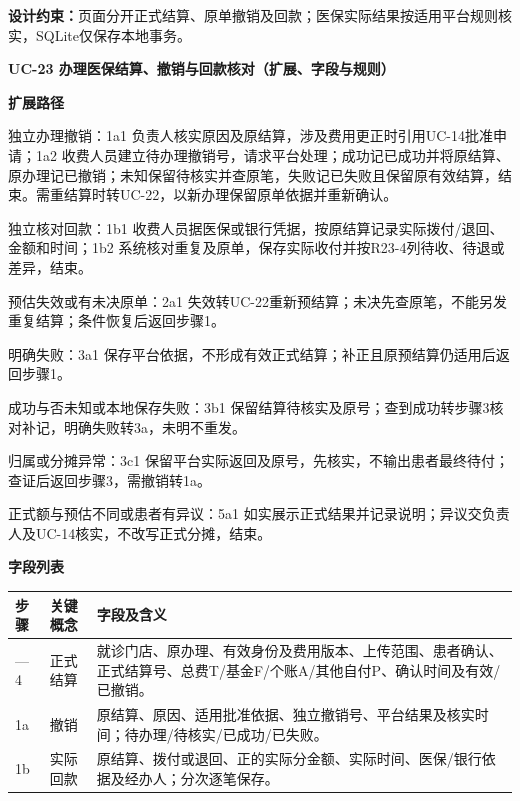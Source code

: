 \documentclass[UTF8,a4paper,zihao=-4,fontset=none]{ctexart}
\begin{document}
\noindent\textbf{设计约束：}页面分开正式结算、原单撤销及回款；医保实际结果按适用平台规则核实，SQLite仅保存本地事务。\par
\endgroup
\clearpage
\begingroup\small\linespread{1.04}\selectfont
\noindent\textbf{UC-23 办理医保结算、撤销与回款核对（扩展、字段与规则）}\par
\noindent\textbf{扩展路径}\par
\begin{description}\setlength{\itemsep}{0pt}\setlength{\parsep}{0pt}\setlength{\topsep}{2pt}
\item[1a] 独立办理撤销：1a1 负责人核实原因及原结算，涉及费用更正时引用UC-14批准申请；1a2 收费人员建立待办理撤销号，请求平台处理；成功记已成功并将原结算、原办理记已撤销；未知保留待核实并查原笔，失败记已失败且保留原有效结算，结束。需重结算时转UC-22，以新办理保留原单依据并重新确认。
\item[1b] 独立核对回款：1b1 收费人员据医保或银行凭据，按原结算记录实际拨付/退回、金额和时间；1b2 系统核对重复及原单，保存实际收付并按R23-4列待收、待退或差异，结束。
\item[2a] 预估失效或有未决原单：2a1 失效转UC-22重新预结算；未决先查原笔，不能另发重复结算；条件恢复后返回步骤1。
\item[3a] 明确失败：3a1 保存平台依据，不形成有效正式结算；补正且原预结算仍适用后返回步骤1。
\item[3b] 成功与否未知或本地保存失败：3b1 保留结算待核实及原号；查到成功转步骤3核对补记，明确失败转3a，未明不重发。
\item[3c] 归属或分摊异常：3c1 保留平台实际返回及原号，先核实，不输出患者最终待付；查证后返回步骤3，需撤销转1a。
\item[5a] 正式额与预估不同或患者有异议：5a1 如实展示正式结果并记录说明；异议交负责人及UC-14核实，不改写正式分摊，结束。
\end{description}
\noindent\textbf{字段列表}\par
{\setlength{\tabcolsep}{3pt}\renewcommand{\arraystretch}{1.04}
\noindent\begin{tabular}{@{}>{\raggedright\arraybackslash}p{1.2cm}>{\raggedright\arraybackslash}p{2.2cm}>{\raggedright\arraybackslash}p{12.3cm}@{}}
\toprule
步骤 & 关键概念 & 字段及含义 \\ \midrule
1—4 & 正式结算 & 就诊门店、原办理、有效身份及费用版本、上传范围、患者确认、正式结算号、总费T/基金F/个账A/其他自付P、确认时间及有效/已撤销。 \\
1a & 撤销 & 原结算、原因、适用批准依据、独立撤销号、平台结果及核实时间；待办理/待核实/已成功/已失败。 \\
1b & 实际回款 & 原结算、拨付或退回、正的实际分金额、实际时间、医保/银行依据及经办人；分次逐笔保存。 \\
\bottomrule
\end{tabular}\par}
\end{document}
